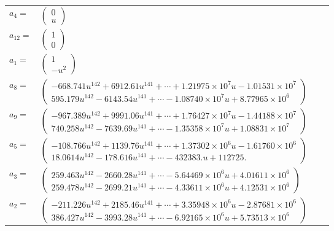 \documentclass[1p]{elsarticle_modified}
\theoremstyle{definition}
\begin{document}
\begin{tabular}{m{7pt} m{180pt} m{7pt} m{180pt} }
\flushright $a_{4}=$&$\begin{pmatrix}0\\u\end{pmatrix}$ \\
\flushright $a_{12}=$&$\begin{pmatrix}1\\0\end{pmatrix}$ \\
\flushright $a_{1}=$&$\begin{pmatrix}1\\- u^2\end{pmatrix}$ \\
\flushright $a_{8}=$&$\begin{pmatrix}-668.741 u^{142}+6912.61 u^{141}+\cdots+1.21975\times10^{7} u-1.01531\times10^{7}\\595.179 u^{142}-6143.54 u^{141}+\cdots-1.08740\times10^{7} u+8.77965\times10^{6}\end{pmatrix}$ \\
\flushright $a_{9}=$&$\begin{pmatrix}-967.389 u^{142}+9991.06 u^{141}+\cdots+1.76427\times10^{7} u-1.44188\times10^{7}\\740.258 u^{142}-7639.69 u^{141}+\cdots-1.35358\times10^{7} u+1.08831\times10^{7}\end{pmatrix}$ \\
\flushright $a_{5}=$&$\begin{pmatrix}-108.766 u^{142}+1139.76 u^{141}+\cdots+1.37302\times10^{6} u-1.61760\times10^{6}\\18.0614 u^{142}-178.616 u^{141}+\cdots-432383. u+112725.\end{pmatrix}$ \\
\flushright $a_{3}=$&$\begin{pmatrix}259.463 u^{142}-2660.28 u^{141}+\cdots-5.64469\times10^{6} u+4.01611\times10^{6}\\259.478 u^{142}-2699.21 u^{141}+\cdots-4.33611\times10^{6} u+4.12531\times10^{6}\end{pmatrix}$ \\
\flushright $a_{2}=$&$\begin{pmatrix}-211.226 u^{142}+2185.46 u^{141}+\cdots+3.35948\times10^{6} u-2.87681\times10^{6}\\386.427 u^{142}-3993.28 u^{141}+\cdots-6.92165\times10^{6} u+5.73513\times10^{6}\end{pmatrix}$ \\

\end{tabular}
\end{document}
